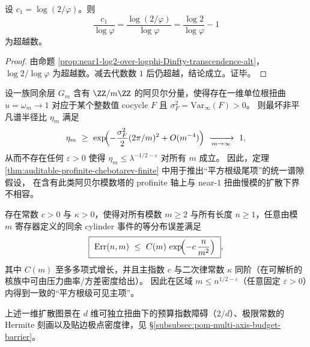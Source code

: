 \begin{corollary}[归一化漂移指数的超越性]\label{cor:near1-normalized-drift-exponent-transcendence}
设 \(c_1=\log(2/\varphi)\)。则
\[
\frac{c_1}{\log\varphi}
=\frac{\log(2/\varphi)}{\log\varphi}
=\frac{\log 2}{\log\varphi}-1
\]
为超越数。
\end{corollary}
\begin{proof}
由命题 \ref{prop:near1-log2-over-logphi-Dinfty-transcendence-alt}，\(\log 2/\log\varphi\) 为超越数。减去代数数 \(1\) 后仍超越，结论成立。证毕。
\end{proof}

\begin{corollary}\label{cor:abelian-tower-no-go}
设一族同余层 \(G_m\) 含有 \(\ZZ/m\ZZ\) 的阿贝尔分量，使得存在一维单位根扭曲 \(u=\omega_m\to 1\)
对应于某个整数值 cocycle \(F\) 且 \(\sigma_F^2=\mathrm{Var}_\infty(F)>0\)。
则最坏非平凡谱半径比 \(\eta_m\) 满足
\[
\eta_m\ \ge\ \exp\!\Bigl(-\frac{\sigma_F^2}{2}(2\pi/m)^2+O(m^{-4})\Bigr)\ \xrightarrow[m\to\infty]{}\ 1,
\]
从而不存在任何 \(\varepsilon>0\) 使得 \(\eta_m\le \lambda^{-1/2-\varepsilon}\) 对所有 \(m\) 成立。
因此，定理 \ref{thm:auditable-profinite-chebotarev-finite} 中用于推出“平方根级尾项”的统一谱隙假设，
在含有此类阿贝尔模数塔的 profinite 轴上与 near-\(1\) 扭曲慢模的扩散下界不相容。
\end{corollary}



\begin{conjecture}\label{conj:scaled-kernel-grh-diffusive}
存在常数 \(c>0\) 与 \(\kappa>0\)，使得对所有模数 \(m\ge 2\) 与所有长度 \(n\ge 1\)，任意由模 \(m\) 寄存器定义的同余 cylinder 事件的等分布误差满足
\[
\boxed{\ \mathrm{Err}(n,m)\ \le\ C(m)\,\exp\!\Bigl(-c\,\frac{n}{m^2}\Bigr)\ },
\]
其中 \(C(m)\) 至多多项式增长，并且主指数 \(c\) 与二次律常数 \(\kappa\) 同阶（在可解析的核族中可由压力曲率/方差密度给出）。
因此在区域 \(m\le n^{1/2-\varepsilon}\)（任意固定 \(\varepsilon>0\)）内得到一致的“平方根级可见主项”。
\end{conjecture}

上述一维扩散图景在 \(d\) 维可独立扭曲下的预算指数障碍（\(2/d\)）、极限常数的 Hermite 刻画以及贴边极点密度律，见 \S\ref{subsubsec:pom-multi-axis-budget-barrier}。
